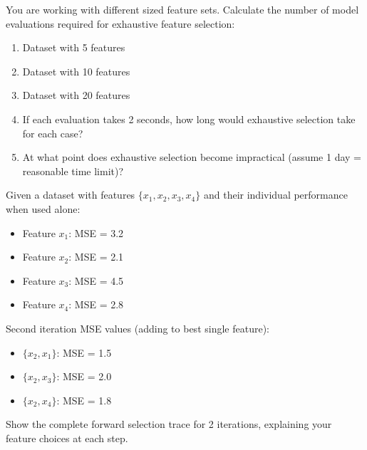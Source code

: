 \documentclass{article}
\newcounter{exercise}
\begin{document}
\begin{tcolorbox}[colback=blue!5!white,colframe=blue!75!black,title=\textbf{Exercise \theexercise: Exhaustive Search Complexity}]
You are working with different sized feature sets. Calculate the number of model evaluations required for exhaustive feature selection:

\begin{enumerate}[label=(\alph*)]
    \item Dataset with 5 features
    \item Dataset with 10 features
    \item Dataset with 20 features
    \item If each evaluation takes 2 seconds, how long would exhaustive selection take for each case?
    \item At what point does exhaustive selection become impractical (assume 1 day = reasonable time limit)?
\end{enumerate}
\end{tcolorbox}

\begin{tcolorbox}[colback=blue!5!white,colframe=blue!75!black,title=\textbf{Exercise \theexercise: Forward Selection Algorithm Trace}]
Given a dataset with features $\{x_1, x_2, x_3, x_4\}$ and their individual performance when used alone:
\begin{itemize}
    \item Feature $x_1$: MSE = 3.2
    \item Feature $x_2$: MSE = 2.1
    \item Feature $x_3$: MSE = 4.5  
    \item Feature $x_4$: MSE = 2.8
\end{itemize}

Second iteration MSE values (adding to best single feature):
\begin{itemize}
    \item $\{x_2, x_1\}$: MSE = 1.5
    \item $\{x_2, x_3\}$: MSE = 2.0
    \item $\{x_2, x_4\}$: MSE = 1.8
\end{itemize}

Show the complete forward selection trace for 2 iterations, explaining your feature choices at each step.
\end{tcolorbox}
\end{document}
